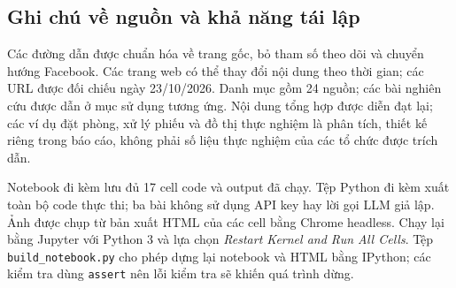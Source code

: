 \documentclass[11pt,a4paper]{article}
\begin{document}
\subsection*{Ghi chú về nguồn và khả năng tái lập}
Các đường dẫn được chuẩn hóa về trang gốc, bỏ tham số theo dõi và chuyển hướng Facebook.
Các trang web có thể thay đổi nội dung theo thời gian; các URL được đối chiếu ngày
23/10/2026. Danh mục gồm 24 nguồn; các bài nghiên cứu được dẫn ở mục sử dụng tương ứng.
Nội dung tổng hợp được diễn đạt lại; các ví dụ đặt phòng,
xử lý phiếu và đồ thị thực nghiệm là phân tích, thiết kế riêng trong báo cáo, không
phải số liệu thực nghiệm của các tổ chức được trích dẫn.

Notebook đi kèm lưu đủ 17 cell code và output đã chạy. Tệp Python đi kèm xuất toàn bộ
code thực thi; ba bài không sử dụng API key hay lời gọi LLM giả lập.
Ảnh được chụp từ bản xuất HTML
của các cell bằng Chrome headless. Chạy lại bằng Jupyter với Python 3 và lựa chọn
\textit{Restart Kernel and Run All Cells}. Tệp \texttt{build\_notebook.py} cho phép dựng
lại notebook và HTML bằng IPython; các kiểm tra dùng \texttt{assert} nên lỗi kiểm tra
sẽ khiến quá trình dừng.
\end{document}
